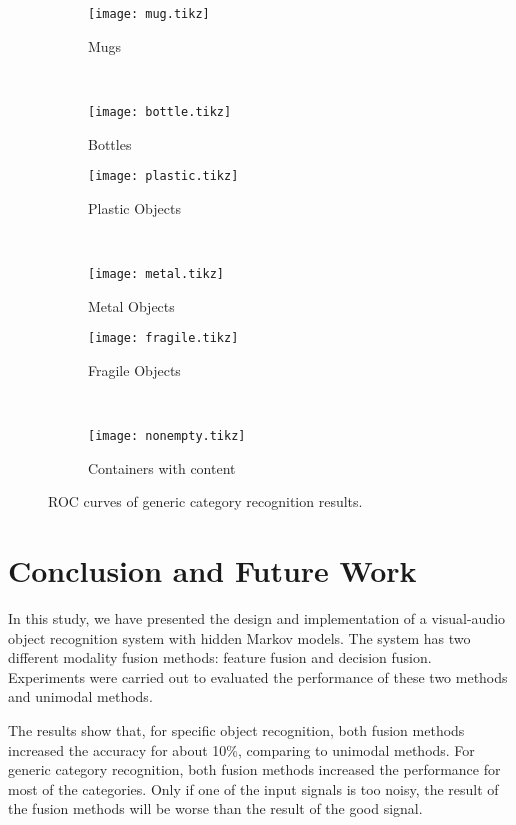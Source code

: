 \documentclass[12pt,final,twoside]{report}
\begin{document}
\begin{figure}[t]
  \footnotesize
  \centering
  \begin{subfigure}[b]{.45\textwidth}
    \texttt{[image: mug.tikz]}
    \caption{Mugs}
    \label{fig:rocmug}
  \end{subfigure}
  ~
  \begin{subfigure}[b]{.45\textwidth}
    \centering
    \texttt{[image: bottle.tikz]}
    \caption{Bottles}
    \label{fig:rocbottle}
  \end{subfigure}

  \begin{subfigure}[b]{.45\textwidth}
    \texttt{[image: plastic.tikz]}
    \caption{Plastic Objects}
    \label{fig:rocplastic}
  \end{subfigure}
  ~
  \begin{subfigure}[b]{.45\textwidth}
    \centering
    \texttt{[image: metal.tikz]}
    \caption{Metal Objects}
    \label{fig:rocmetal}
  \end{subfigure}

  \begin{subfigure}[b]{.45\textwidth}
    \texttt{[image: fragile.tikz]}
    \caption{Fragile Objects}
    \label{fig:rocfragile}
  \end{subfigure}
  ~
  \begin{subfigure}[b]{.45\textwidth}
    \centering
    \texttt{[image: nonempty.tikz]}
    \caption{Containers with content}
    \label{fig:rocnonempty}
  \end{subfigure}
  \caption{ROC curves of generic category recognition results.}
  \label{fig:catroc}
\end{figure}

\cleardoublepage
\chapter{Conclusion and Future Work}
\label{ch:conclusion}
In this study, we have presented the design and implementation of a visual-audio object recognition system with hidden Markov models. The system has two different modality fusion methods: feature fusion and decision fusion. Experiments were carried out to evaluated the performance of these two methods and unimodal methods.

The results show that, for specific object recognition, both fusion methods increased the accuracy for about 10\%, comparing to unimodal methods. For generic category recognition, both fusion methods increased the performance for most of the categories. Only if one of the input signals is too noisy, the result of the fusion methods will be worse than the result of the good signal. 
\end{document}
